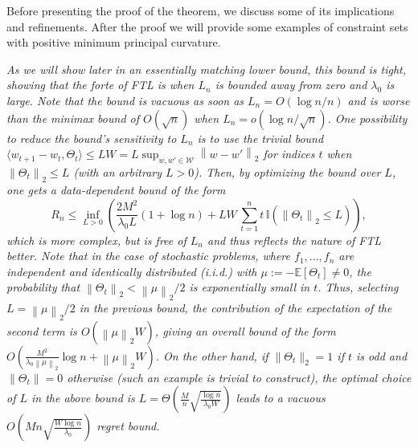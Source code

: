 \documentclass[english]{article}
\newcommand{\cW}{\mathcal{W}}
\newcommand{\Exp}[1]{\mathbb{E}\left[ #1 \right]}
\newcommand{\ind}{\mathbb{I}}
\newcommand{\one}[1]{\ind\left(#1\right)}
\newcommand{\ip}[1]{\langle#1\rangle}
\newcommand{\norm}[1]{\left\| #1 \right\|}
\begin{document}
Before presenting the proof of the theorem, we discuss some of its implications and refinements. After the proof we will provide some examples of constraint sets with positive minimum principal curvature.

\begin{remark} \em
As we will show later in an essentially matching lower bound, this bound is tight, showing that the forte  
of FTL is when $L_n$ is bounded away from zero and $\lambda_0$ is large.
Note that the bound is vacuous as soon as $L_n =O( \log n/n )$
and is worse than the minimax bound of $O(\sqrt{n})$ when $L _n = o( \log n/\sqrt{n} )$. 
One possibility to reduce the bound's sensitivity to $L_n$  
is to use the trivial bound $\ip{w_{t+1}-w_t,\Theta_t} \le L W = L \sup_{w,w'\in \cW} \norm{w-w'}_2$ 
for indices $t$ when $\norm{\Theta_t}_2\le L$ (with an arbitrary $L>0$). Then, by optimizing the bound over $L$, 
one gets a data-dependent bound
of the form 
\begin{equation}
\label{eq:Lbound}
R_n \le \inf_{L>0} \left(\frac{2M^2}{\lambda_0 L} (1+\log n) +  LW \, \sum_{t=1}^n t \,\one{ \norm{\Theta_t}_2\le L }\right),
\end{equation}
which is more complex, but is free of $L_n$ and thus reflects the nature of FTL better.
Note that in the case of stochastic problems, where $f_1,\ldots,f_n$ are independent and identically distributed (i.i.d.) with $\mu := -\Exp{\Theta_t}\ne 0$, the probability that $\norm{\Theta_t}_2 < \norm{\mu}_2/2$ is exponentially small in $t$. Thus, selecting $L=\norm{\mu}_2/2$ in the previous bound, the contribution of the expectation of the second term is $O(\norm{\mu}_2W)$, giving an overall bound of the form $O(\frac{M^2}{\lambda_0 \norm{\mu}_2}\log n+\norm{\mu}_2 W)$. 
On the other hand, if $\|\Theta_t\|_2 = 1$ if $t$ is odd and $\|\Theta_t\| = 0$ otherwise (such an example is trivial to construct), the optimal choice of $L$ in the above bound is $L= \Theta\left(\frac{M}{n}\sqrt{\frac{\log n}{\lambda_0 W}}\right)$ leads to a vacuous $O\left(Mn\sqrt{\frac{W\log n}{\lambda_0}}\right)$ regret bound.
\end{remark}
\end{document}
